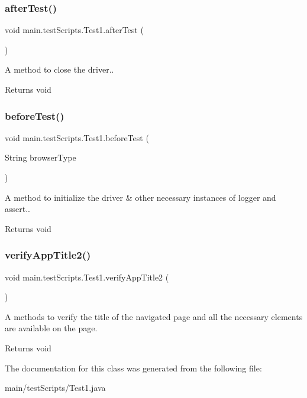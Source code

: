\subsubsection{\texorpdfstring{after\+Test()}{afterTest()}}
{\footnotesize\ttfamily void main.\+test\+Scripts.\+Test1.\+after\+Test (\begin{DoxyParamCaption}{ }\end{DoxyParamCaption})}

A  method to close the driver.. \begin{DoxyReturn}{Returns}
void 
\end{DoxyReturn}
\mbox{\label{classmain_1_1test_scripts_1_1_test1_a8dc6636009624d1b3d4dbbf804642e79}} 
\subsubsection{\texorpdfstring{before\+Test()}{beforeTest()}}
{\footnotesize\ttfamily void main.\+test\+Scripts.\+Test1.\+before\+Test (\begin{DoxyParamCaption}\item[{String}]{browser\+Type }\end{DoxyParamCaption})}

A  method to initialize the driver \& other necessary instances of logger and assert.. \begin{DoxyReturn}{Returns}
void 
\end{DoxyReturn}
\mbox{\label{classmain_1_1test_scripts_1_1_test1_a2c86a510c69dfa3237bcab629cc80a73}} 
\subsubsection{\texorpdfstring{verify\+App\+Title2()}{verifyAppTitle2()}}
{\footnotesize\ttfamily void main.\+test\+Scripts.\+Test1.\+verify\+App\+Title2 (\begin{DoxyParamCaption}{ }\end{DoxyParamCaption})}

A  methods to verify the title of the navigated page and all the necessary elements are available on the page. \begin{DoxyReturn}{Returns}
void 
\end{DoxyReturn}


The documentation for this class was generated from the following file\+:\begin{DoxyCompactItemize}
\item 
main/test\+Scripts/Test1.\+java\end{DoxyCompactItemize}
